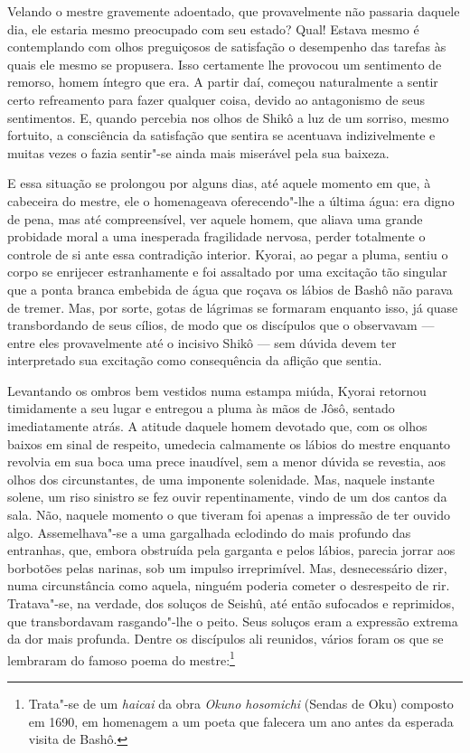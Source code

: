 Velando o mestre gravemente adoentado, que provavelmente não passaria
daquele dia, ele estaria mesmo preocupado com seu estado? Qual! Estava
mesmo é contemplando com olhos preguiçosos de satisfação o desempenho
das tarefas às quais ele mesmo se propusera. Isso certamente lhe
provocou um sentimento de remorso, homem íntegro que era. A partir daí,
começou naturalmente a sentir certo refreamento para fazer qualquer
coisa, devido ao antagonismo de seus sentimentos. E, quando percebia
nos olhos de Shikô a luz de um sorriso, mesmo fortuito, a consciência
da satisfação que sentira se acentuava indizivelmente e muitas vezes o
fazia sentir"-se ainda mais miserável pela sua baixeza.

E essa situação se prolongou por alguns dias, até aquele momento em que,
à cabeceira do mestre, ele o homenageava oferecendo"-lhe a última água:
era digno de pena, mas até compreensível, ver aquele homem, que aliava
uma grande probidade moral a uma inesperada fragilidade nervosa, perder
totalmente o controle de si ante essa contradição interior. Kyorai, ao
pegar a pluma, sentiu o corpo se enrijecer estranhamente e foi
assaltado por uma excitação tão singular que a ponta branca embebida de
água que roçava os lábios de Bashô não parava de tremer. Mas, por
sorte, gotas de lágrimas se formaram enquanto isso, já quase
transbordando de seus cílios, de modo que os discípulos que o
observavam --- entre eles provavelmente até o incisivo Shikô --- sem dúvida
devem ter interpretado sua excitação como consequência da aflição que
sentia.

Levantando os ombros bem vestidos numa estampa miúda, Kyorai retornou
timidamente a seu lugar e entregou a pluma às mãos de Jôsô, sentado
imediatamente atrás. A atitude daquele homem devotado que, com os olhos
baixos em sinal de respeito, umedecia calmamente os lábios do mestre
enquanto revolvia em sua boca uma prece inaudível, sem a menor dúvida
se revestia, aos olhos dos circunstantes, de uma imponente solenidade.
Mas, naquele instante solene, um riso sinistro se fez ouvir
repentinamente, vindo de um dos cantos da sala. Não, naquele momento o
que tiveram foi apenas a impressão de ter ouvido algo. Assemelhava"-se a
uma gargalhada eclodindo do mais profundo das entranhas, que, embora
obstruída pela garganta e pelos lábios, parecia jorrar aos borbotões
pelas narinas, sob um impulso irreprimível. Mas, desnecessário dizer,
numa circunstância como aquela, ninguém poderia cometer o desrespeito
de rir. Tratava"-se, na verdade, dos soluços de Seishû, até então
sufocados e reprimidos, que transbordavam rasgando"-lhe o peito. Seus
soluços eram a expressão extrema da dor mais profunda. Dentre os
discípulos ali reunidos, vários foram os que se lembraram do famoso
poema do mestre:\footnote{ Trata"-se de um \emph{haicai} da obra \textit{Okuno
hosomichi} (Sendas de Oku) composto em 1690, em homenagem a um poeta 
que falecera um ano antes da esperada visita de Bashô.}

